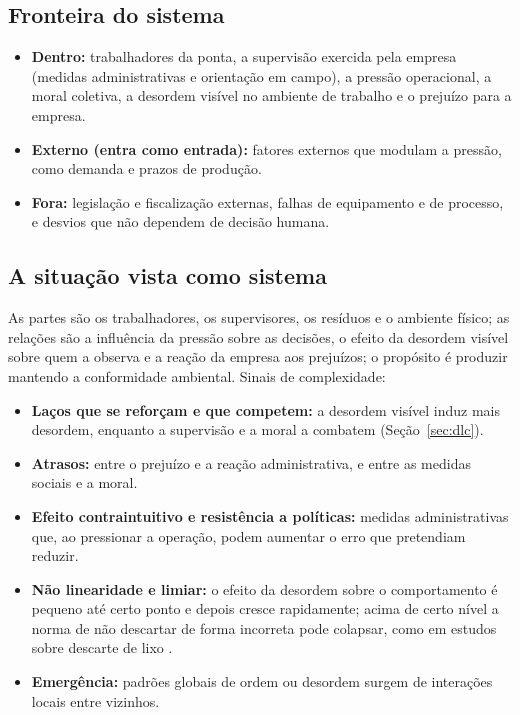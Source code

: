 \documentclass[11pt, a4paper]{article}
\begin{document}
\subsection{Fronteira do sistema}
\begin{itemize}
  \item \textbf{Dentro:} trabalhadores da ponta, a supervisão exercida pela empresa (medidas administrativas e orientação em campo), a pressão operacional, a moral coletiva, a desordem visível no ambiente de trabalho e o prejuízo para a empresa.
  \item \textbf{Externo (entra como entrada):} fatores externos que modulam a pressão, como demanda e prazos de produção.
  \item \textbf{Fora:} legislação e fiscalização externas, falhas de equipamento e de processo, e desvios que não dependem de decisão humana.
\end{itemize}

\subsection{A situação vista como sistema}
As partes são os trabalhadores, os supervisores, os resíduos e o ambiente físico; as relações são a influência da pressão sobre as decisões, o efeito da desordem visível sobre quem a observa e a reação da empresa aos prejuízos; o propósito é produzir mantendo a conformidade ambiental. Sinais de complexidade:
\begin{itemize}
  \item \textbf{Laços que se reforçam e que competem:} a desordem visível induz mais desordem, enquanto a supervisão e a moral a combatem (Seção~\ref{sec:dlc}).
  \item \textbf{Atrasos:} entre o prejuízo e a reação administrativa, e entre as medidas sociais e a moral.
  \item \textbf{Efeito contraintuitivo e resistência a políticas:} medidas administrativas que, ao pressionar a operação, podem aumentar o erro que pretendiam reduzir.
  \item \textbf{Não linearidade e limiar:} o efeito da desordem sobre o comportamento é pequeno até certo ponto e depois cresce rapidamente; acima de certo nível a norma de não descartar de forma incorreta pode colapsar, como em estudos sobre descarte de lixo \citep{rangoni2017}.
  \item \textbf{Emergência:} padrões globais de ordem ou desordem surgem de interações locais entre vizinhos.
\end{itemize}
\end{document}
